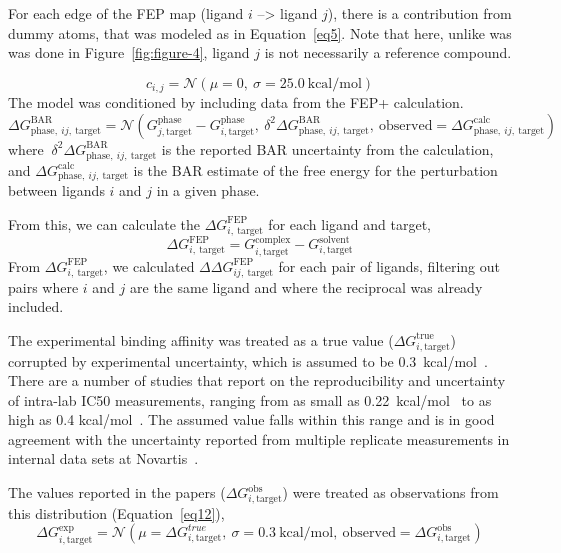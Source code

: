 \documentclass[phd,tocprelim]{cornell}
\begin{document}
For each edge of the FEP map (ligand $i$ --> ligand $j$), there is a contribution from dummy atoms, that was modeled as in Equation~\ref{eq5}. Note that here, unlike was was done in Figure~\ref{fig:figure-4}, ligand $j$ is not necessarily a reference compound. 

\begin{equation}\label{eq5}
c_{i,j} = \mathcal{N}(\mu=0,~\sigma=25.0~\text{kcal/mol})
\end{equation}
The model was conditioned by including data from the FEP+ calculation.  
\begin{equation}\label{eq6}
\Delta G^\text{BAR}_{\text{phase}, ~ij, ~\text{target}} = \mathcal{N}(G^\text{phase}_{j, \text{target}} - G^\text{phase}_{i, \text{target}},~\delta^2\Delta G^\text{BAR}_{\text{phase}, ~ij, ~\text{target}}, ~\text{observed} = \Delta G^\text{calc}_{\text{phase},~ij,~\text{target}})
\end{equation}
where $~\delta^2\Delta G^\text{BAR}_{\text{phase}, ~ij, ~\text{target}}$ is the reported BAR uncertainty from the calculation, and $\Delta G^\text{calc}_{\text{phase},~ij,~\text{target}}$ is the BAR estimate of the free energy for the perturbation between ligands $i$ and $j$ in a given phase. 

From this, we can calculate the $\Delta G^\text{FEP}_{i, ~\text{target}}$ for each ligand and target,
\begin{equation}\label{eq7}
\Delta G^\text{FEP}_{i, ~\text{target}} = G^\text{complex}_{i, \text{target}} - G^\text{solvent}_{i, \text{target}}
\end{equation}
From $\Delta G^\text{FEP}_{i,~\text{target}}$, we calculated $\Delta \Delta G^\text{FEP}_{ij, ~\text{target}}$ for each pair of ligands, filtering out pairs where $i$ and $j$ are the same ligand and where the reciprocal was already included. 

The experimental binding affinity was treated as a true value ($\Delta G^\text{true}_{i,\text{target}}$) corrupted by experimental uncertainty, which is assumed to be 0.3~kcal/mol~\citep{BROWN2009420}. There are a number of studies that report on the reproducibility and uncertainty of intra-lab IC50 measurements, ranging from as small as 0.22~kcal/mol~\citep{Hauser:2018vz} to as high as 0.4 kcal/mol~\citep{BROWN2009420}. The assumed value falls within this range and is in good agreement with the uncertainty reported from multiple replicate measurements in internal data sets at Novartis~\citep{Kalliokoski:PloSOne:2013}. 

The values reported in the papers ($\Delta G^\text{obs}_{i,\text{target}}$) were treated as observations from this distribution (Equation~\ref{eq12}),
\begin{equation}
\Delta G^\text{exp}_{i,\text{target}} = \mathcal{N}(\mu=\Delta G^{true}_{i,\text{target}}, ~\sigma=0.3~\text{kcal/mol},~\text{observed} = \Delta G^\text{obs}_{i,\text{target}}) \label{eq12}
\end{equation}
\end{document}

